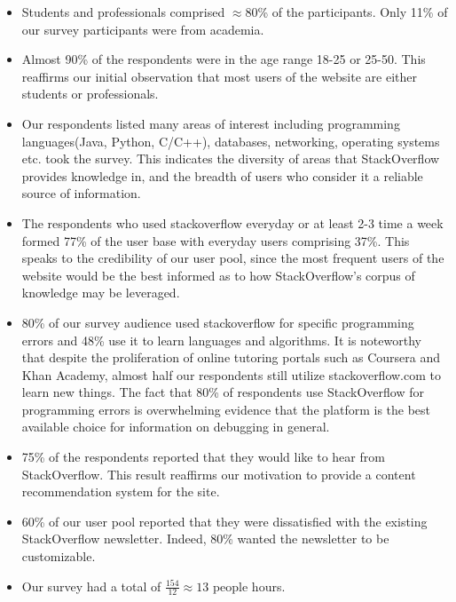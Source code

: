 \documentclass{sig-alternate-05-2015}
\begin{document}
\begin{itemize}


\item Students and professionals comprised $\approx$80\% of the participants. Only 11\% of our survey participants
were from academia. 

\item Almost 90\% of the respondents were in the age range 18-25 or 25-50. This reaffirms our initial observation that most users of the website are either students or professionals.

\item Our respondents listed many areas of interest including programming languages(Java, Python, C/C++), databases, networking, operating systems etc. took the survey. This indicates the diversity of areas that StackOverflow provides knowledge in, and the breadth of users who consider it a reliable source of information.
 
\item The respondents who used stackoverflow everyday or at least 2-3 time a week formed 77\% of the user base with everyday users comprising 37\%. This speaks to the credibility of our user pool, since the most frequent users of the website would be the best informed as to how StackOverflow's corpus of knowledge may be leveraged.
 
\item 80\% of our survey audience used stackoverflow for specific programming errors and 48\% use it to learn languages and algorithms. It is noteworthy that despite the proliferation of online tutoring portals such as Coursera and Khan Academy, almost half our respondents still utilize stackoverflow.com to learn new things. The fact that 80\% of respondents use StackOverflow for programming errors is overwhelming evidence that the platform is the best available choice for information on debugging in general.

\item 75\% of the respondents reported that they would like to hear from StackOverflow. This result reaffirms our motivation to provide a content recommendation system for the site.

\item 60\% of our user pool reported that they were dissatisfied with the existing StackOverflow newsletter. Indeed, 80\% wanted the newsletter to be customizable.

\item Our survey had a total of $\frac{154}{12}\approx13$ people hours.
\end{itemize}
\end{document}
